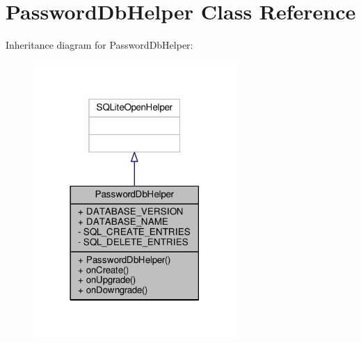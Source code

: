 \hypertarget{a00012}{\section{Password\+Db\+Helper Class Reference}
\label{a00012}
}


Inheritance diagram for Password\+Db\+Helper\+:
\nopagebreak
\begin{figure}[H]
\begin{center}
\leavevmode
\includegraphics[width=218pt]{a00073}
\end{center}
\end{figure}


